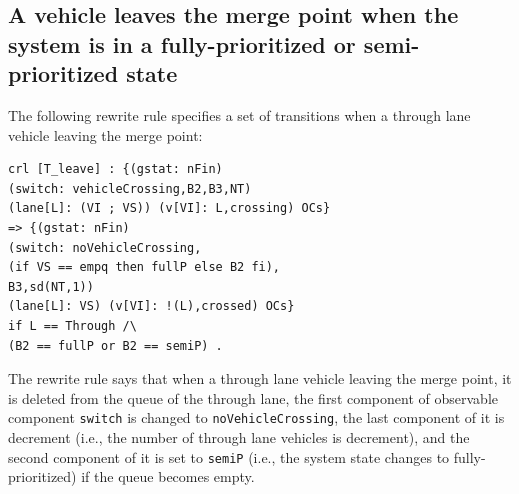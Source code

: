 \documentclass[10pt, conference, compsocconf]{IEEEtran}
\begin{document}
\subsection{A vehicle leaves the merge point when the system is in a fully-prioritized or semi-prioritized state}



The following rewrite rule specifies a set of transitions when a through lane vehicle leaving the merge point:

\begin{small}
\begin{verbatim}
crl [T_leave] : {(gstat: nFin) 
(switch: vehicleCrossing,B2,B3,NT) 
(lane[L]: (VI ; VS)) (v[VI]: L,crossing) OCs} 
=> {(gstat: nFin) 
(switch: noVehicleCrossing,
(if VS == empq then fullP else B2 fi),
B3,sd(NT,1)) 
(lane[L]: VS) (v[VI]: !(L),crossed) OCs} 
if L == Through /\ 
(B2 == fullP or B2 == semiP) .
\end{verbatim}
\end{small}

\noindent
The rewrite rule says that when a through lane vehicle leaving the merge point, it is deleted from the queue of the through lane, the first component of observable component \verb!switch! is changed to \verb!noVehicleCrossing!, the last component of it is decrement (i.e., the number of through lane vehicles is decrement), and the second component of it is set to \verb!semiP! (i.e., the system state changes to fully-prioritized) if the queue becomes empty.
\end{document}
